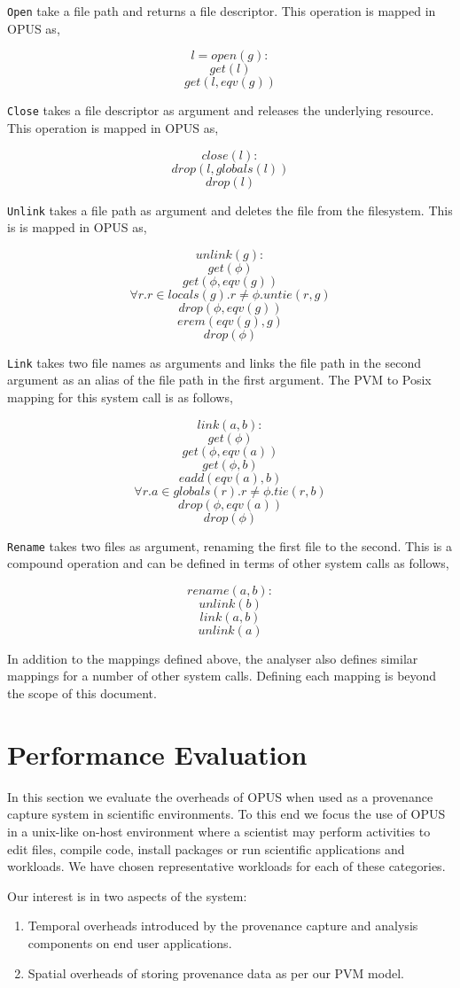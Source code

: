 \documentclass[withindex,glossary]{cam-thesis}
\begin{document}
\texttt{Open} take a file path and returns a file descriptor.
This operation is mapped in OPUS as,

$$l = open(g):$$
$$get(l)$$
$$get(l, eqv(g))$$

\texttt{Close} takes a file descriptor as argument and releases the underlying resource.
This operation is mapped in OPUS as,

$$close(l):$$
$$drop(l, globals(l))$$
$$drop(l)$$

\texttt{Unlink} takes a file path as argument and deletes the file from the filesystem.
This is is mapped in OPUS as,

$$unlink(g):$$
$$get(\phi)$$
$$get(\phi,eqv(g))$$
$$\forall r.r \in locals(g).r\neq\phi.untie(r,g)$$
$$drop(\phi,eqv(g))$$
$$erem(eqv(g),g)$$
$$drop(\phi)$$

\texttt{Link} takes two file names as arguments and links the file path in the second argument as an alias of the file path in the first argument.
The PVM to Posix mapping for this system call is as follows,

$$link(a,b):$$
$$get(\phi)$$
$$get(\phi,eqv(a))$$
$$get(\phi,b)$$
$$eadd(eqv(a),b)$$
$$\forall r.a \in globals(r).r\neq\phi.tie(r,b)$$
$$drop(\phi,eqv(a))$$
$$drop(\phi)$$

\texttt{Rename} takes two files as argument, renaming the first file to the second.
This is a compound operation and can be defined in terms of other system calls as follows,

$$rename(a,b):$$
$$unlink(b)$$
$$link(a,b)$$
$$unlink(a)$$

In addition to the mappings defined above, the analyser also defines similar mappings for a number of other system calls.
Defining each mapping is beyond the scope of this document.

\section{Performance Evaluation}
In this section we evaluate the overheads of OPUS when used as a provenance capture system in scientific environments.
To this end we focus the use of OPUS in a unix-like on-host environment where a scientist may perform activities to
edit files, compile code, install packages or run scientific applications and workloads.
We have chosen representative workloads for each of these categories.

Our interest is in two aspects of the system:
\begin{enumerate}
\item Temporal overheads introduced by the provenance capture and analysis components on end user applications.
\item Spatial overheads of storing provenance data as per our PVM model.
\end{enumerate}
\end{document}
